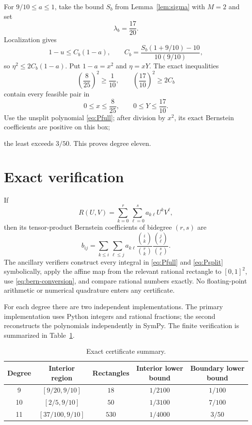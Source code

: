 \documentclass[11pt]{article}
\theoremstyle{remark}
\begin{document}
For $9/10\le a\le1$, take the bound $S_b$ from
Lemma~\ref{lem:sigma} with $M=2$ and set
\[
 \lambda_b=\frac{17}{20}.
\]
Localization gives
\[
 1-u\le C_b(1-a),
 \qquad
 C_b=\frac{S_b(1+9/10)-10}{10(9/10)},
\]
so $\eta^2\le2C_b(1-a)$.  Put $1-a=x^2$ and $\eta=xY$.  The exact
inequalities
\[
 \left(\frac8{25}\right)^2\ge\frac1{10},
 \qquad
 \left(\frac{17}{10}\right)^2\ge2C_b
\]
contain every feasible pair in
\[
 0\le x\le\frac8{25},
 \qquad
 0\le Y\le\frac{17}{10}.
\]
Use the unsplit polynomial \eqref{eq:Pfull}; after division by $x^2$, its
exact Bernstein coefficients are positive on this box;

the least exceeds $3/50$.  This proves degree eleven.

\section{Exact verification}

If
\[
 R(U,V)=\sum_{k=0}^r\sum_{\ell=0}^s a_{k\ell}U^kV^\ell,
\]
then its tensor-product Bernstein coefficients of bidegree $(r,s)$ are
\begin{equation}\label{eq:bern-conversion}
 b_{ij}=
 \sum_{k\le i}\sum_{\ell\le j}a_{k\ell}
 \frac{\binom ik}{\binom rk}
 \frac{\binom j\ell}{\binom s\ell}.
\end{equation}
The ancillary verifiers construct every integral in
\eqref{eq:Pfull} and \eqref{eq:Psplit} symbolically, apply the affine map from
the relevant rational rectangle to $[0,1]^2$, use
\eqref{eq:bern-conversion}, and compare rational numbers exactly.  No
floating-point arithmetic or numerical quadrature enters any certificate.

For each degree there are two independent implementations.  The primary
implementation uses Python integers and rational fractions; the second
reconstructs the polynomials independently in SymPy.  The finite verification
is summarized in Table~\ref{tab:summary}.

\begin{table}[ht]
\centering
\small
\caption{Exact certificate summary.}\label{tab:summary}
\begin{tabular}{@{}c c c c c@{}}
\toprule
Degree & Interior region & Rectangles & Interior lower bound & Boundary lower bound\\
\midrule
9  & $[9/20,9/10]$ & $18$  & $1/2100$ & $1/100$\\
10 & $[2/5,9/10]$  & $50$  & $1/3100$ & $7/100$\\
11 & $[37/100,9/10]$ & $530$ & $1/4000$ & $3/50$\\
\bottomrule
\end{tabular}
\end{table}
\end{document}
